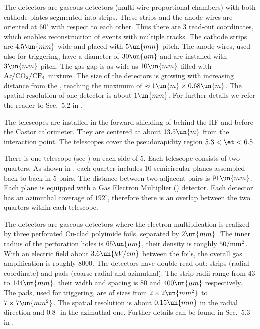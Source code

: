 \bmfig
{}
\emfig

The  detectors are gaseous detectors (multi-wire proportional chambers) with both cathode plates segmented into strips. These strips and the anode wires are oriented at $60^\circ$ with respect to each other. Thus there are 3 read-out coordinates, which enables reconstruction of events with multiple tracks. The cathode strips are $4.5\un{mm}$ wide and placed with $5\un{mm}$ pitch. The anode wires, used also for triggering, have a diameter of $30\un{\mu m}$ and are installed with $3\un{mm}$ pitch. The gas gap is as wide as $10\un{mm}$ filled with $\rm Ar/CO_2/CF_4$ mixture. The size of the detectors is growing with increasing distance from the , reaching the maximum of $\approx 1\un{m} \times 0.68\un{m}$. The spatial resolution of one  detector is about $1\un{mm}$. For further details we refer the reader to Sec.~5.2 in .




The  telescopes are installed in the forward shielding of  behind the HF and before the Castor calorimeter. They are centered at about $13.5\un{m}$ from the interaction point. The  telescopes cover the pseudorapidity region $5.3 < \et < 6.5$.

There is one telescope (see ) on each side of 5. Each telescope consists of two quarters. As shown in , each quarter includes 10 semicircular planes assembled back-to-back in 5 pairs. The distance between two adjacent pairs is $91\un{mm}$. Each plane is equipped with a Gas Electron Multiplier () detector. Each detector has an azimuthal coverage of $192^\circ$, therefore there is an overlap between the two quarters within each telescope.

The  detectors are gaseous detectors where the electron multiplication is realized by three perforated Cu-clad polyimide foils, separated by $2\un{mm}$. The inner radius of the perforation holes is $65\un{\mu m}$, their density is roughly $50/\rm mm^2$. With an electric field about $3.6 \un{kV/cm}$ between the  foils, the overall gas amplification is roughly $8000$. The  detectors have double read-out: strips (radial coordinate) and pads (coarse radial and azimuthal). The strip radii range from $43$ to $144\un{mm}$, their width and spacing is $80$ and $400\un{\mu m}$ respectively. The pads, used for triggering, are of sizes from $2\times 2\un{mm^2}$ to $7\times 7\un{mm^2}$. The spatial resolution is about $0.15\un{mm}$ in the radial direction and $0.8^\circ$ in the azimuthal one. Further details can be found in Sec.~5.3 in .

